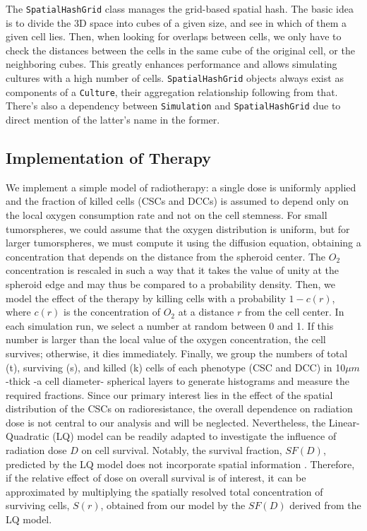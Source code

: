 \documentclass[10pt,letterpaper]{article}
\begin{document}
The \lstinline|SpatialHashGrid| class manages the grid-based spatial hash. The basic idea is to divide the 3D space into cubes of a given size, and see in which of them a given cell lies. Then, when looking for overlaps between cells, we only have to check the distances between the cells in the same cube of the original cell, or the neighboring cubes. This greatly enhances performance and allows simulating cultures with a high number of cells. \lstinline|SpatialHashGrid| objects always exist as components of a \lstinline|Culture|, their aggregation relationship following from that. There's also a dependency between \lstinline|Simulation| and \lstinline|SpatialHashGrid| due to direct mention of the latter's name in the former.


\subsection*{Implementation of Therapy}

We implement a simple model of radiotherapy: a single dose is uniformly applied and the fraction of killed cells (CSCs and DCCs) is assumed to depend only on the local oxygen consumption rate and not on the cell stemness. 
For small tumorspheres, we could assume that the oxygen distribution is uniform, but for larger tumorspheres, we must compute it using the diffusion equation, obtaining a concentration that depends on the distance from the spheroid center. The $O_2$ concentration is rescaled in such a way that it takes the value of unity at the spheroid edge and may thus be compared to a probability density. Then, we model the effect of the therapy by killing cells with a probability $1-c(r)$, where $c(r)$ is the concentration of $O_2$ at a distance $r$ from the cell center.  In each simulation run, we select a number at random between 0 and 1. If this number is larger than the local value of the oxygen concentration, the cell survives; otherwise, it dies immediately. Finally, we group the numbers of total (t), surviving (s), and killed (k) cells of each phenotype (CSC and DCC) in 10$\mu m$-thick -a cell diameter- spherical layers to generate histograms and measure the required fractions. 
Since our primary interest lies in the effect of the spatial distribution of the CSCs on radioresistance, the overall dependence on radiation dose is not central to our analysis and will be neglected. Nevertheless, the Linear-Quadratic (LQ) model can be readily adapted to investigate the influence of radiation dose $D$ on cell survival. Notably, the survival fraction, $SF(D)$, predicted by the LQ model does not incorporate spatial information \cite{chadwick1973molecular,buffa2000analysis,bruningk2019}. Therefore, if the relative effect of dose on overall survival is of interest, it can be approximated by multiplying the spatially resolved total concentration of surviving cells, $S(r)$, obtained from our model by the $SF(D)$ derived from the LQ model.
\end{document}

